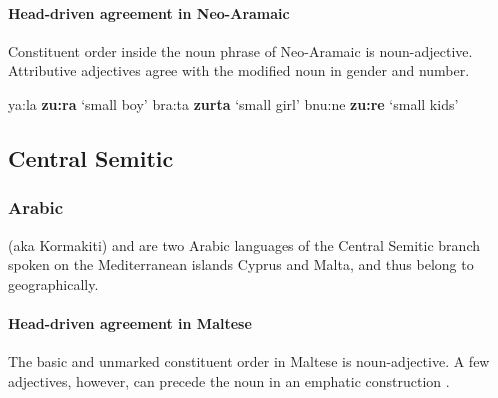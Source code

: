 \paragraph*{Head\hyp{}driven agreement in Neo-Aramaic}
Constituent order inside the noun phrase of Neo-Aramaic is noun-adjective. Attributive adjectives agree with the modified noun in gender and number.
\begin{exe}
\begin{xlist}
\ex	ya:la \textbf{zu:ra}	{\rm ‘small boy’}
\ex	bra:ta \textbf{zurta}	{\rm ‘small girl’}
\ex	bnu:ne \textbf{zu:re}	{\rm ‘small kids’}
\end{xlist}
\end{exe}

\subsection{Central Semitic}		
\subsubsection{Arabic}
 (aka Kormakiti) and  are two Arabic languages of the Central Semitic branch spoken on the Mediterranean islands Cyprus and Malta, and thus belong to  geographically.

\paragraph*{Head\hyp{}driven agreement in Maltese}
The basic and unmarked constituent order in Maltese is noun-adjective. A few adjectives, however, can precede the noun in an emphatic construction \citep[71]{borg-etal1996}.

